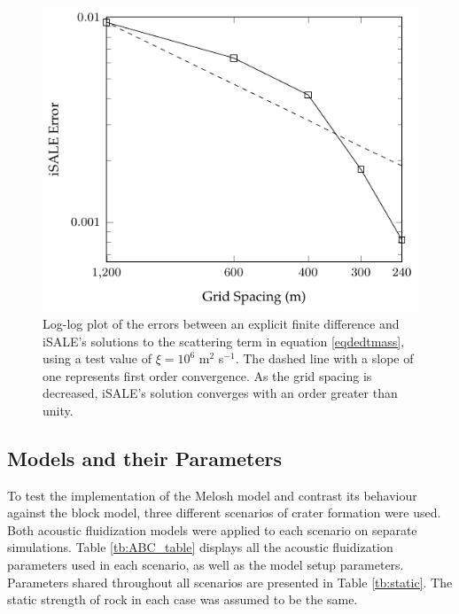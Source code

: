 \begin{figure}[!ht]
		\centering
		\includegraphics[width=\linewidth]{./images/scatter_test2.pdf}
		\caption{Log-log plot of the errors between an explicit finite difference and iSALE's solutions to the scattering term in equation \ref{eqdedtmass}, using a test value of $\xi=10^{6}$ m$^2$ s$^{-1}$. The dashed line with a slope of one represents first order convergence. As the grid spacing is decreased, iSALE's solution converges with an order greater than unity.\label{fig:scatter_test}}
\end{figure}\vspace{-0.3cm}

\subsection{Models and their Parameters}\label{sec:parameters}

To test the implementation of the Melosh model and contrast its behaviour against the block model, three different scenarios of crater formation were used. Both acoustic fluidization models were applied to each scenario on separate simulations. Table \ref{tb:ABC_table} displays all the acoustic fluidization parameters used in each scenario, as well as the model setup parameters. Parameters shared throughout all scenarios are presented in Table \ref{tb:static}. The static strength of rock in each case was assumed to be the same.



